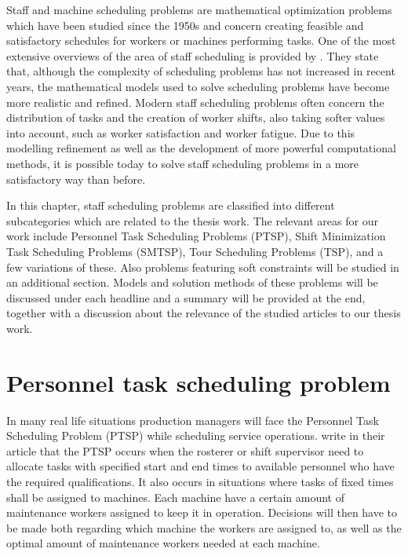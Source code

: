 
Staff and machine scheduling problems are mathematical optimization problems which have been studied since the 1950s and concern creating feasible and satisfactory schedules for workers or machines performing tasks. One of the most extensive overviews of the area of staff scheduling is provided by \citet{ernst_2004}. They state that, although the complexity of scheduling problems has not increased in recent years, the mathematical models used to solve scheduling problems have become more realistic and refined. Modern staff scheduling problems often concern the distribution of tasks and the creation of worker shifts, also taking softer values into account, such as worker satisfaction and worker fatigue. Due to this modelling refinement as well as the development of more powerful computational methods, it is possible today to solve staff scheduling problems in a more satisfactory way than before.

In this chapter, staff scheduling problems are classified into different subcategories which are related to the thesis work. The relevant areas for our work include Personnel Task Scheduling Problems (PTSP), Shift Minimization Task Scheduling Problems (SMTSP), Tour Scheduling Problems (TSP), and a few variations of these. Also problems featuring soft constraints will be studied in an additional section. Models and solution methods of these problems will be discussed under each headline and a summary will be provided at the end, together with a discussion about the relevance of the studied articles to our thesis work.


\section{Personnel task scheduling problem} \label{PTSP}

In many real life situations production managers will face the Personnel Task Scheduling Problem (PTSP) while scheduling service operations. \citet{krishnamoorthy_2001} write in their article that the PTSP occurs when the rosterer or shift supervisor need to allocate tasks with specified start and end times to available personnel who have the required qualifications. It also occurs in situations where tasks of fixed times shall be assigned to machines. Each machine have a certain amount of maintenance workers assigned to keep it in operation. Decisions will then have to be made both regarding which machine the workers are assigned to, as well as the optimal amount of maintenance workers needed at each machine.

